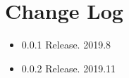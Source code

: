 \section{Change Log}
\begin{itemize}
\item{0.0.1} Release. 2019.8
\item{0.0.2} Release. 2019.11
\end{itemize}
